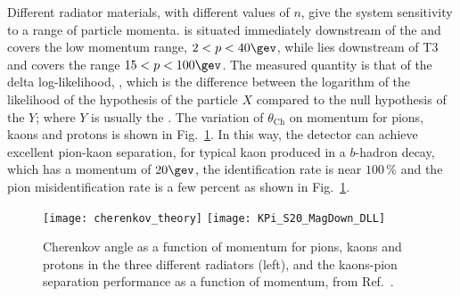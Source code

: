 Different radiator materials, with different values of $n$, give the \rich system sensitivity to a
range of particle momenta.
\richone is situated immediately downstream of the \velo and covers the low momentum range,
$2<p<40\gev$, while \richtwo lies downstream of T3 and covers the range $15<p<100\gev$.
The measured quantity is that of the delta log-likelihood, \dllxy, which is the difference between the
logarithm of the likelihood of the hypothesis of the particle $X$ compared to the null hypothesis of the
$Y$; where $Y$ is usually the \pion.
The variation of $\theta_\mathrm{Ch}$ on momentum for pions, kaons and protons is shown in
Fig.~\ref{fig:lhcb:pideff}.
In this way, the \lhcb detector can achieve excellent pion-kaon separation, for typical kaon
produced in a $b$-hadron decay, which has a
momentum of \approx$20\gev$, the identification rate is near $100\,\%$ and the pion misidentification
rate is a few percent as shown in Fig.~\ref{fig:lhcb:pideff}.

\begin{figure}
  \begin{center}
    \texttt{[image: cherenkov\_theory]}
    \texttt{[image: KPi\_S20\_MagDown\_DLL]}
  \end{center}
  \caption[Particle identification and Cherenkov angles]
  {
    Cherenkov angle as a function of momentum for pions, kaons and protons in the three different
    radiators (left), and the kaons-pion separation performance as a function of momentum, from
    Ref.~\cite{LHCb-DP-2012-003}.
  }
  \label{fig:lhcb:pideff}
\end{figure}




